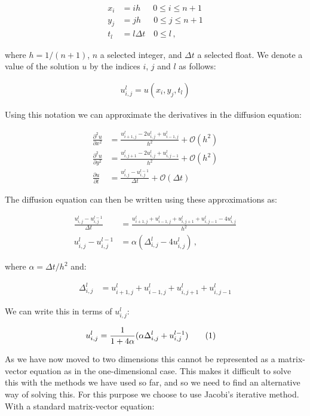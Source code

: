 \documentclass[reprint,english,notitlepage]{revtex4-1}  %
\newcommand\numberthis{\addtocounter{equation}{1}\tag{\theequation}}
\begin{document}
\begin{align*}
x_i &= i h \,\,\,\quad 0 \leq i \leq n+1 \\
y_j &= j h \,\,\,\quad 0 \leq j \leq n+1 \\
t_l &= l \Delta t \quad 0 \leq l \, ,
\end{align*}

where $h = 1/(n+1)$, $n$ a selected integer, and $\Delta t$ a selected float. We denote a value of the solution $u$ by the indices $i$, $j$ and $l$ as follows:

\begin{align*}
u_{i,j}^l = u(x_i,y_j,t_l)
\end{align*}

Using this notation we can approximate the derivatives in the diffusion equation:

\begin{align*}
\frac{\partial^2 u}{\partial x^2} &= \frac{u_{i+1,j}^l - 2u_{i,j}^l + u_{i-1,j}^l}{h^2} + \mathcal{O}(h^2) \\
\frac{\partial^2 u}{\partial y^2} &= \frac{u_{i,j+1}^l - 2u_{i,j}^l + u_{i,j-1}^l}{h^2} + \mathcal{O}(h^2)\\
\frac{\partial u}{\partial t} &= \frac{u_{i,j}^l - u_{i,j}^{l-1} }{\Delta t} + \mathcal{O}(\Delta t)
\end{align*}

The diffusion equation can then be written using these approximations as:

\begin{align*}
\frac{u_{i,j}^l - u_{i,j}^{l-1} }{\Delta t}  &= \frac{u_{i+1,j}^l + u_{i-1,j}^l + u_{i,j+1}^l + u_{i,j-1}^l - 4u_{i,j}^l}{h^2} \\
u_{i,j}^l - u_{i,j}^{l-1} &= \alpha(\Delta_{i,j}^l - 4u_{i,j}^l) \, , 
\end{align*}

where $\alpha = \Delta t /h^2$ and:

\begin{align*}
\Delta_{i,j}^l &= u_{i+1,j}^l + u_{i-1,j}^l + u_{i,j+1}^l + u_{i,j-1}^l
\end{align*}

We can write this in terms of $u_{i,j}^l$:

\begin{align*}
u_{i,j}^l &= \frac{1}{1 + 4\alpha} (\alpha \Delta_{i,j}^l + u_{i,j}^{l-1} ) \numberthis \label{eq:2D_diff_eq_numerical_solution}
\end{align*}

As we have now moved to two dimensions this cannot be represented as a matrix-vector equation as in the one-dimensional case. This makes it difficult to solve this with the methods we have used so far, and so we need to find an alternative way of solving this. For this purpose we choose to use Jacobi's iterative method. With a standard matrix-vector equation:
\end{document}
